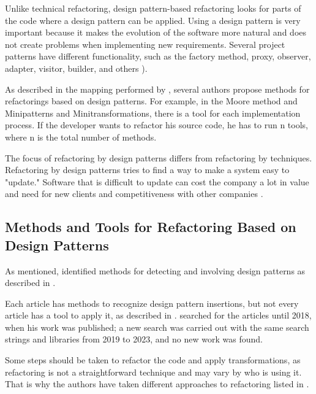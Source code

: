 Unlike technical refactoring, design pattern-based refactoring looks for parts of the code where a design pattern can be applied. Using a design pattern is very important because it makes the evolution of the software more natural and does not create problems when implementing new requirements. Several project patterns have different functionality, such as the factory method, proxy, observer, adapter, visitor, builder, and others \cite{Gamma2009}). 

As described in the mapping performed by \textcite{beluzzo2018abordagem}, several authors propose methods for refactorings based on design patterns. For example, in the Moore method and Minipatterns and Minitransformations, there is a tool for each implementation process. If the developer wants to refactor his source code, he has to run n tools, where n is the total number of methods.

The focus of refactoring by design patterns differs from refactoring by techniques. Refactoring by design patterns tries to find a way to make a system easy to "update." Software that is difficult to update can cost the company a lot in value and need for new clients and competitiveness with other companies \cite{cinneide2000automated}.

\subsection{Methods and Tools for Refactoring Based on Design Patterns}
\label{sec-tools}

As mentioned, \textcite{beluzzo2018abordagem} identified methods for detecting and involving design patterns as described in .



Each article has methods to recognize design pattern insertions, but not every article has a tool to apply it, as described in . \textcite{beluzzo2018abordagem} searched for the articles until 2018, when his work was published; a new search was carried out with the same search strings and libraries from 2019 to 2023, and no new work was found.

Some steps should be taken to refactor the code and apply transformations, as refactoring is not a straightforward technique and may vary by who is using it. That is why the authors have taken different approaches to refactoring listed in .



